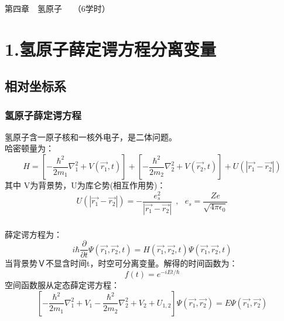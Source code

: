 \begin{frame}
		\frametitle{}
		\Background[1] 
	    \begin{center}
		{ {\Huge 第四章~~氢原子~~  （6学时）}}
	    \end{center}    
\end{frame}

\section{1.氢原子薛定谔方程分离变量 }

\subsection{相对坐标系}

\begin{frame}
	\frametitle{氢原子薛定谔方程}
	氢原子含一原子核和一核外电子，是二体问题。\\
	{\Bullet}哈密顿量为：
	\begin{equation*}
		H=\left[-\frac{\hbar^2}{2 m_1} \nabla_1 ^2 + V(\vec{r_1},t) \right]  + \left[-\frac{\hbar^2}{2 m_2} \nabla_2 ^2 + V(\vec{r_2},t) \right]  +U(| \vec{r_1}-\vec{r_2} | )
	\end{equation*}
	其中 V为背景势，U为库仑势(相互作用势)：
	\begin{equation*}
		U(| \vec{r_1}-\vec{r_2} | )=-\frac{e_s ^2}{| \vec{r_1}-\vec{r_2} |} ~~,~~~ e_s =\frac{Ze}{\sqrt{4\pi\epsilon_0}}
	\end{equation*}
\end{frame}

\begin{frame}
	\frametitle{}
	{\Bullet}薛定谔方程为：
	\begin{equation*}
		i\hbar \frac{\partial }{\partial t} \Psi (\vec{r_1},\vec{r_2},t ) =H (\vec{r_1},\vec{r_2}, t  )  \Psi (\vec{r_1},\vec{r_2},t ) 
	\end{equation*}
	{\Bullet}当背景势Ｖ不显含时间t，时空可分离变量。解得的时间函数为：
	\begin{equation*}
		f(t) =e^{-iEt/\hbar}
	\end{equation*}
	空间函数服从定态薛定谔方程：
	\begin{equation*}
		\left[-\frac{\hbar^2}{2 m_1} \nabla_1 ^2 + V_1  -\frac{\hbar^2}{2 m_2} \nabla_2 ^2 + V_2  +U_{1,2} \right] \Psi (\vec{r_1},\vec{r_2}) =E \Psi (\vec{r_1},\vec{r_2}) 
	\end{equation*}
\end{frame}		

